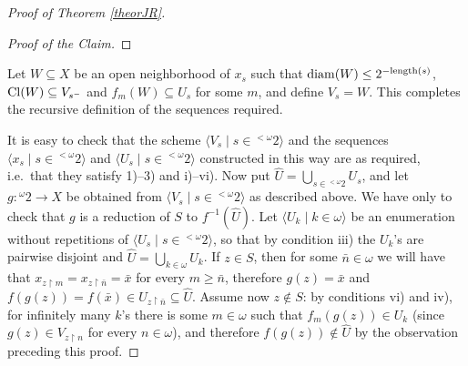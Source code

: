 \documentclass{rae}
\def\leng{{\rm length}}
\def\Cl{{\rm Cl}}
\newcommand{\Can}{\ensuremath{{}^\omega 2}}
\newcommand{\conc}{{}^\smallfrown}
\newcommand{\restr}[2]{#1 \restriction #2}
\newcommand{\seq}[2]{\langle #1 \mid  #2 \rangle}
\theoremstyle{definition}
\begin{document}
\begin{proof}[Proof of Theorem \ref{theorJR}]
\begin{proof}[Proof of the Claim]
\renewcommand{\qedsymbol}{$\square$ \textit{Claim}}
\end{proof}

Let $W \subseteq X$ be an open neighborhood of $x_s$ such that ${\rm 
diam}(W) \leq 2^{-\leng(s)}$, $\Cl(W) \subseteq V_{s^-}$ and $f_m (W) 
\subseteq U_s$ for some $m$,  and define $V_s = W$. This completes the recursive
definition of the sequences required.

It is easy to check that the scheme $\seq{V_s}{s \in {}^{<\omega}2}$ and
the sequences $\seq{x_s}{s \in {}^{<\omega}2}$ and $\seq{U_s}{s \in {}^{<\omega}2}$
constructed in this way are as required, i.e.\ that they satisfy 1)--3) 
and i)--vi). Now put $\hat{U} = \bigcup_{s \in {}^{< \omega} 2} U_s$,
and let $g\colon \Can \to X$ be obtained from $\seq{V_s}{s \in {}^{<\omega}2}$ 
as described 
above.  We have only to check that $g$ is a reduction of $S$ to 
$f^{-1}(\hat{U})$. Let $\seq{U_k}{k \in \omega}$
be an enumeration without repetitions of $\seq{U_s}{s \in {}^{<\omega}2}$, 
so that by condition iii) the $U_k$'s are pairwise 
disjoint and $\hat{U} = \bigcup_{k \in \omega} 
U_k$. If $z \in S$, then for some $\bar{n} \in \omega$ 
we will have that $x_{\restr{z}{m}} = x_{\restr{z}{\bar{n}}} = \bar{x}$ 
for every $m \geq \bar{n}$, therefore $g(z) = \bar{x}$ and $f(g(z)) = 
f(\bar{x}) \in U_{\restr{z}{\bar{n}}} \subseteq \hat{U}$. Assume now 
$z \notin S$: by conditions vi) and iv), for infinitely many $k$'s there
is some $m \in \omega$ such that $f_m(g(z)) \in U_k$ (since $g(z) \in 
V_{\restr{z}{n}}$ for every $n \in \omega$), and therefore $f(g(z))
\notin \hat{U}$ by the observation preceding this proof.
\end{proof}
\end{document}
